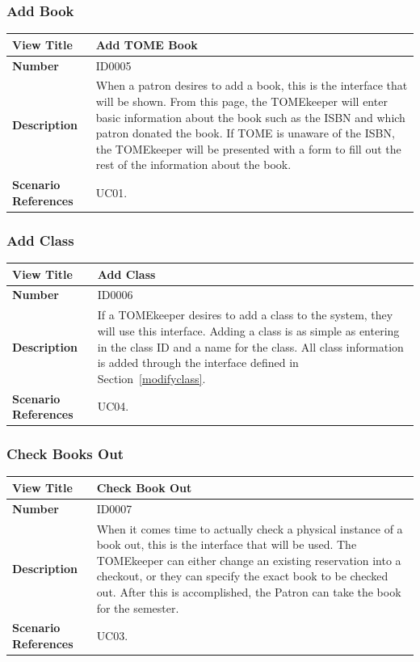 \documentclass[12pt,titlepage]{article}
\begin{document}
\subsubsection{Add Book}
\begin{tabular}{|p{}|p{}|}
	\hline
	\textbf{View Title} & Add TOME Book\\
	\hline
	\textbf{Number} & ID0005 \\
	\hline
	\textbf{Description} & When a patron desires to add a book, this is the interface that will be shown.  From this page, the TOMEkeeper will enter basic information about the book such as the ISBN and which patron donated the book.  If TOME is unaware of the ISBN, the TOMEkeeper will be presented with a form to fill out the rest of the information about the book.\\
	\hline
	\textbf{Scenario References} & UC01.\\
	\hline
\end{tabular}

\subsubsection{Add Class}
\begin{tabular}{|p{}|p{}|}
	\hline
	\textbf{View Title} & Add Class\\
	\hline
	\textbf{Number} & ID0006 \\
	\hline
	\textbf{Description} & If a TOMEkeeper desires to add a class to the system, they will use this interface.  Adding a class is as simple as entering in the class ID and a name for the class.  All class information is added through the interface defined in Section~\ref{modifyclass}.\\
	\hline
	\textbf{Scenario References} & UC04.\\
	\hline
\end{tabular}

\subsubsection{Check Books Out}
\begin{tabular}{|p{}|p{}|}
	\hline
	\textbf{View Title} & Check Book Out\\
	\hline
	\textbf{Number} & ID0007 \\
	\hline
	\textbf{Description} & When it comes time to actually check a physical instance of a book out, this is the interface that will be used.  The TOMEkeeper can either change an existing reservation into a checkout, or they can specify the exact book to be checked out.  After this is accomplished, the Patron can take the book for the semester.\\
	\hline
	\textbf{Scenario References} & UC03.\\
	\hline
\end{tabular}
\end{document}
